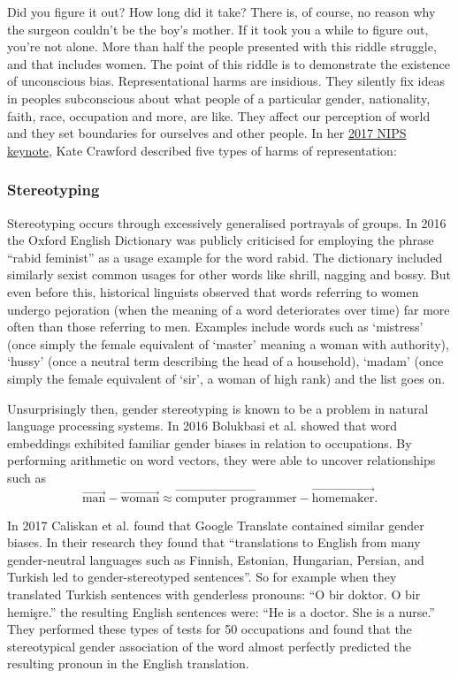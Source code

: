 Did you figure it out? How long did it take? There is, of course, no reason why the surgeon couldn't be the boy's mother. If it took you a while to figure out, you're not alone. More than half the people presented with this riddle struggle, and that includes women. The point of this riddle is to demonstrate the existence of unconscious bias. Representational harms are insidious. They silently fix ideas in peoples subconscious about what people of a particular gender, nationality, faith, race, occupation and more, are like. They affect our perception of world and they set boundaries for ourselves and other people. In her \href{https://www.youtube.com/watch?v=fMym_BKWQzk}{2017 NIPS keynote}, Kate Crawford described five types of harms of representation:

\subsubsection*{Stereotyping}

Stereotyping occurs through excessively generalised portrayals of groups. In 2016 the Oxford English Dictionary was publicly criticised\cite{SexistOED} for employing the phrase ``rabid feminist'' as a usage example for the word rabid. The dictionary included similarly sexist common usages for other words like shrill, nagging and bossy. But even before this, historical linguists observed that words referring to women undergo pejoration (when the meaning of a word deteriorates over time) far more often than those referring to men\cite{Pejoration}. Examples include words such as `mistress' (once simply the female equivalent of `master' meaning a woman with authority), `hussy' (once a neutral term describing the head of a household), `madam' (once simply the female equivalent of `sir', a woman of high rank) and the list goes on.

Unsurprisingly then, gender stereotyping  is known to be a problem in natural language processing systems. In 2016 Bolukbasi et al. showed that word embeddings exhibited familiar gender biases in relation to occupations\cite{WomanHomemaker}. By performing arithmetic on word vectors, they were able to uncover relationships such as
\[
\overrightarrow{\textrm{man}} - \overrightarrow{\textrm{woman}} \approx \overrightarrow{\textrm{computer programmer}} - \overrightarrow{\textrm{homemaker}}.
\]

In 2017 Caliskan et al. found that Google Translate contained similar gender biases.\cite{BiasSemantics} In their research they found that ``translations to English from many gender-neutral languages such as Finnish, Estonian, Hungarian, Persian, and Turkish led to gender-stereotyped sentences''. So for example when they translated Turkish sentences with genderless pronouns: ``O bir doktor. O bir hemi\c{s}re.'' the resulting English sentences were: ``He is a doctor. She is a nurse.'' They performed these types of tests for 50 occupations and found that the stereotypical gender association of the word almost perfectly predicted the resulting pronoun in the English translation.

